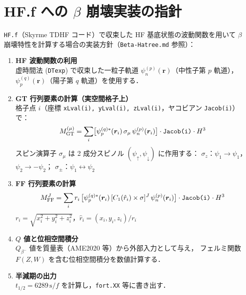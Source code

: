 \documentclass[12pt,a4paper]{ltjsarticle}
\begin{document}
\section{HF.f への $\beta$ 崩壊実装の指針}

\texttt{HF.f}（Skyrme TDHF コード）で収束した HF 基底状態の波動関数を用いて
$\beta$ 崩壊特性を計算する場合の実装方針（\texttt{Beta-Hatree.md} 参照）：

\begin{enumerate}
  \item \textbf{HF 波動関数の利用}\\
        虚時間法 (\texttt{DTexp}) で収束した一粒子軌道
        $\psi_n^{(p)}(\bm{r})$（中性子第 $p$ 軌道），
        $\psi_p^{(q)}(\bm{r})$（陽子第 $q$ 軌道）を使用する．

  \item \textbf{GT 行列要素の計算（実空間格子上）}\\
        格子点 $i$（座標 \texttt{xLval(i), yLval(i), zLval(i)}，ヤコビアン \texttt{Jacob(i)}）で：
        \begin{equation}
          M_{\rm GT}^{(\mu)} = \sum_i
          \bigl[\psi_p^{(q)*}(\bm{r}_i)\, \sigma_\mu\, \psi_n^{(p)}(\bm{r}_i)\bigr]
          \cdot \texttt{Jacob(i)} \cdot H^3
        \end{equation}
        スピン演算子 $\sigma_\mu$ は 2 成分スピノル $(\psi_{\uparrow}, \psi_{\downarrow})$ に作用する：
        $\sigma_z$：$\psi_1 \to \psi_1$，$\psi_2 \to -\psi_2$；
        $\sigma_\pm$：$\psi_1 \leftrightarrow \psi_2$

  \item \textbf{FF 行列要素の計算}\\
        \begin{equation}
          M_{\rm FF}^{J} = \sum_i r_i\,
          \bigl[\psi_p^{(q)*}(\bm{r}_i)\,
          [C_1(\hat{r}_i) \times \sigma]^J\,
          \psi_n^{(p)}(\bm{r}_i)\bigr]
          \cdot \texttt{Jacob(i)} \cdot H^3
        \end{equation}
        $r_i = \sqrt{x_i^2 + y_i^2 + z_i^2}$，$\hat{r}_i = (x_i, y_i, z_i)/r_i$

  \item \textbf{$Q$ 値と位相空間積分}\\
        $Q_{\beta^-}$ 値を質量表（AME2020 等）から外部入力として与え，
        フェルミ関数 $F(Z, W)$ を含む位相空間積分を数値計算する．

  \item \textbf{半減期の出力}\\
        $t_{1/2} = 6289\,\text{s} / f$ を計算し，\texttt{fort.XX} 等に書き出す．
\end{enumerate}
\end{document}
